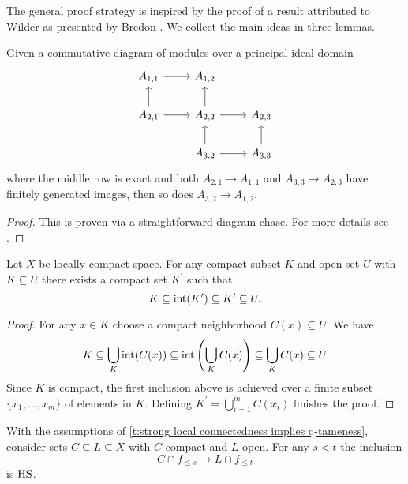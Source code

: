 The general proof strategy is inspired by the proof of a result attributed to Wilder as presented by Bredon \cite[Section II.17]{Bredon.1997}.
We collect the main ideas in three lemmas.

\begin{lem} \label{l:commutative algebra}
	Given a commutative diagram of modules over a principal ideal domain
	\begin{equation*}
	\begin{tikzcd}
	A_{1,1} \arrow[r] & A_{1,2} & \\
	A_{2,1} \arrow[r] \arrow[u] & A_{2,2} \arrow[r] \arrow[u] & A_{2,3} \\
	& A_{3,2} \arrow[r] \arrow[u] & A_{3,3} \arrow[u]
	\end{tikzcd}
	\end{equation*}
	where the middle row is exact and both $A_{2,1} \to A_{1,1}$ and $A_{3,3} \to A_{2,3}$ have finitely generated images, then so does $A_{3,2} \to A_{1,2}$.
\end{lem}

\begin{proof}
	This is proven via a straightforward diagram chase. For more details see \cite[Lemma 17.3]{Bredon.1997}.
\end{proof}

\begin{lem} \label{l:neighborhood third}
	Let $X$ be locally compact space.
	For any compact subset $K$ and open set $U$ with $K \subseteq U$ there exists a compact set $K^\prime$ such that
	\begin{equation*}
	K \subseteq \operatorname{int}(K^\prime) \subseteq K^\prime \subseteq U.
	\end{equation*}
\end{lem}

\begin{proof}
	For any $x \in K$ choose a compact neighborhood $C(x) \subseteq U$.
	We have
	\begin{equation*}
	K \subseteq \bigcup_K \operatorname{int}(C(x)) \subseteq \operatorname{int}\left(\bigcup_K C(x)\right) \subseteq \bigcup_K C(x) \subseteq U
	\end{equation*}
	Since $K$ is compact, the first inclusion above is achieved over a finite subset $\{x_1, \dots, x_m\}$ of elements in $K$.
	Defining $K^\prime = \bigcup_{i=1}^m C(x_i)$ finishes the proof.
\end{proof}

\begin{lem} \label{l:key lemma for q-tameness}
    With the assumptions of \cref{t:strong local connectedness implies q-tameness},
	consider sets $C \subseteq L \subseteq X$ with $C$ compact and $L$ open.
	For any $s < t$ the inclusion
	\[
	C \cap f_{\leq s} \to L \cap f_{\leq t}
	\]
	is $\mathrm{HS}$.
\end{lem}

